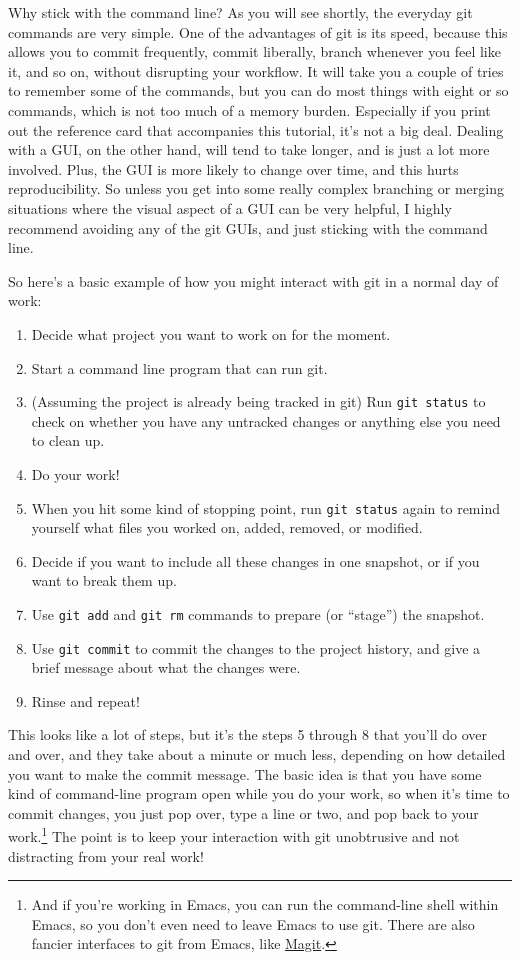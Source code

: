 \documentclass{article}
\begin{document}
Why stick with the command line? As you will see shortly, the everyday git commands are very simple. One of the advantages of git is its speed, because this allows you to commit frequently, commit liberally, branch whenever you feel like it, and so on, without disrupting your workflow. It will take you a couple of tries to remember some of the commands, but you can do most things with eight or so commands, which is not too much of a memory burden.  Especially if you print out the reference card that accompanies this tutorial, it's not a big deal.  Dealing with a GUI, on the other hand, will tend to take longer, and is just a lot more involved. Plus, the GUI is more likely to change over time, and this hurts reproducibility. So unless you get into some really complex branching or merging situations where the visual aspect of a GUI can be very helpful, I highly recommend avoiding any of the git GUIs, and just sticking with the command line.

So here's a basic example of how you might interact with git in a normal day of work:
\begin{enumerate}
\item Decide what project you want to work on for the moment.
\item Start a command line program that can run git.
\item (Assuming the project is already being tracked in git) Run \texttt{git status} to check on whether you have any untracked changes or anything else you need to clean up.
\item Do your work!
\item When you hit some kind of stopping point, run \texttt{git status} again to remind yourself what files you worked on, added, removed, or modified.
\item Decide if you want to include all these changes in one snapshot, or if you want to break them up.
\item Use \texttt{git add} and \texttt{git rm} commands to prepare (or ``stage'') the snapshot.
\item Use \texttt{git commit} to commit the changes to the project history, and give a brief message about what the changes were.
\item Rinse and repeat!
\end{enumerate}

This looks like a lot of steps, but it's the steps 5 through 8 that you'll do over and over, and they take about a minute or much less, depending on how detailed you want to make the commit message.  The basic idea is that you have some kind of command-line program open while you do your work, so when it's time to commit changes, you just pop over, type a line or two, and pop back to your work.\footnote{And if you're working in Emacs, you can run the command-line shell within Emacs, so you don't even need to leave Emacs to use git. There are also fancier interfaces to git from Emacs, like \href{http://magit.github.io/magit/}{Magit}.
 } The point is to keep your interaction with git unobtrusive and not distracting from your real work!
\end{document}
